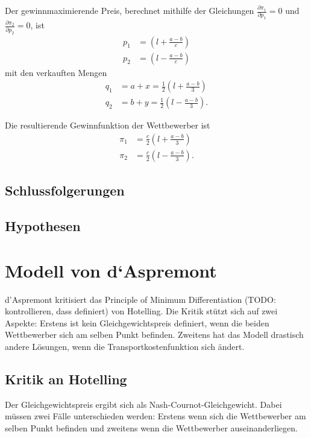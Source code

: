 Der gewinnmaximierende Preis, berechnet mithilfe der Gleichungen $\frac{\partial \pi_1}{\partial p_1}=0$ und $\frac{\partial \pi_2}{\partial p_2}=0$, ist
\begin{equation}
\begin{split}
p_1 &= \left(l+\frac{a-b}{c}\right) \\
p_2 &= \left(l-\frac{a-b}{c}\right)
\end{split}
\end{equation}
mit den verkauften Mengen
\begin{equation}
\begin{split}
q_1 &= a + x = \tfrac{1}{2} \left(l + \frac{a-b}{3}\right) \\
q_2 &= b + y = \tfrac{1}{2} \left(l - \frac{a-b}{3}\right)
.\end{split}
\end{equation}

Die resultierende Gewinnfunktion der Wettbewerber ist
\begin{equation}\label{eqn:Gewinnfunktion}
\begin{split}
\pi_1 &= \frac{c}{2} \left(l+\frac{a-b}{3}\right) \\
\pi_2 &= \frac{c}{2} \left(l-\frac{a-b}{3}\right)
.\end{split}
\end{equation}

\subsection{Schlussfolgerungen}

\subsection{Hypothesen}

\section{Modell von d‘Aspremont}\label{Sec-Aspremont}

d'Aspremont \citep{aspremont1979} kritisiert das Principle of Minimum Differentiation (TODO: kontrollieren, dass definiert) von Hotelling.
Die Kritik stützt sich auf zwei Aspekte: Erstens ist kein Gleichgewichtspreis definiert, wenn die beiden Wettbewerber sich am selben Punkt befinden. Zweitens hat das Modell drastisch andere Lösungen, wenn die Transportkostenfunktion sich ändert.

\subsection{Kritik an Hotelling}
Der Gleichgewichtspreis ergibt sich als Nash-Cournot-Gleichgewicht. Dabei müssen zwei Fälle unterschieden werden: Erstens wenn sich die Wettbewerber am selben Punkt befinden und zweitens wenn die Wettbewerber auseinanderliegen.


